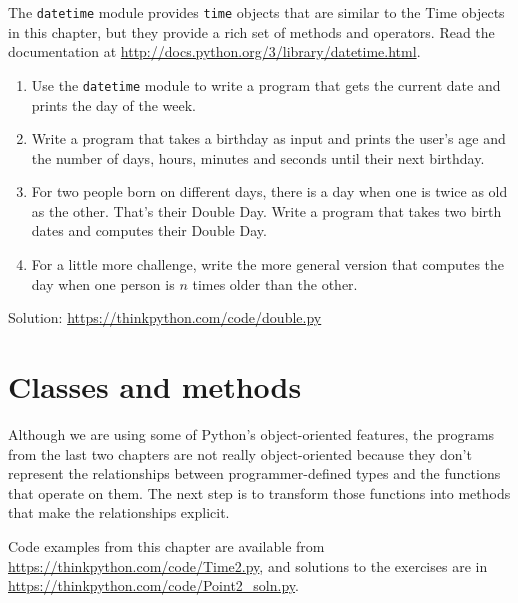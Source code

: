 \documentclass[10pt]{book}
\begin{document}
\begin{exercise}

The {\tt datetime} module provides {\tt time} objects
that are similar to the Time objects in this chapter, but
they provide a rich set of methods and operators.  Read the
documentation at \url{http://docs.python.org/3/library/datetime.html}.

\begin{enumerate}

\item Use the {\tt datetime} module to write a program that gets the
  current date and prints the day of the week.

\item Write a program that takes a birthday as input and prints the
  user's age and the number of days, hours, minutes and seconds until
  their next birthday.

\item For two people born on different days, there is a day when one
  is twice as old as the other.  That's their Double Day.  Write a
  program that takes two birth dates and computes their Double Day.

\item For a little more challenge, write the more general version that
  computes the day when one person is $n$ times older than the other.

\end{enumerate}

Solution: \url{https://thinkpython.com/code/double.py}

\end{exercise}


\chapter{Classes and methods}

Although we are using some of Python's object-oriented features,
the programs from the last two chapters are not really
object-oriented because they don't represent the relationships
between programmer-defined types and the functions that operate
on them.  The next step is to transform those functions into
methods that make the relationships explicit.

Code examples from this chapter are available from
\url{https://thinkpython.com/code/Time2.py}, and solutions
to the exercises are in \url{https://thinkpython.com/code/Point2_soln.py}.
\end{document}

